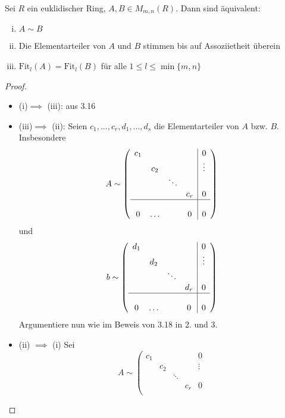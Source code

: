 \documentclass[a4paper, titlepage]{article}
\theoremstyle{definition}
\newcommand{\Fit}{\mathrm{Fit}}
\begin{document}
\begin{satz}
    Sei $R$ ein euklidischer Ring, $A,B\in M_{m,n}(R)$. Dann sind äquivalent:
    \begin{enumerate}[(i)]
        \item $A\sim B$
        \item Die Elementarteiler von $A$ und $B$ stimmen bis auf Assoziietheit überein
        \item $\Fit_{l}(A)=\Fit_{l}(B)$ für alle $ 1\leq l \leq \min\{m,n\}$
    \end{enumerate}
\end{satz}
\begin{proof}
    \begin{itemize}
        \item (i)$\implies$ (iii): aus 3.16
        \item (iii)$\implies$ (ii): Seien $c_1,...,c_r,d_1,...,d_s$ die Elementarteiler von $A$ bzw. $B$. Insbesondere
        $$A\sim \left(\begin{array}{cccc|c}
            c_1& & & &0\\
            & c_2& & & \vdots \\  
            & & \ddots& & \\
            & & & c_r&0 \\
            \hline & & & & \\
            0&\hdots &\ &0 & 0\\
        \end{array}\right)$$
        und
        $$b\sim \left(\begin{array}{cccc|c}
            d_1& & & &0\\
            & d_2& & & \vdots \\  
            & & \ddots& & \\
            & & & d_r&0 \\
            \hline & & & & \\
            0&\hdots &\ &0 & 0\\
        \end{array}\right)$$
        Argumentiere nun wie im Beweis von 3.18 in 2. und 3.
        \item (ii) $\implies$ (i) Sei
        $$A\sim \left(\begin{array}{cccc|c}
            c_1& & & &0\\
            & c_2& & & \vdots \\  
            & & \ddots& & \\
            & & & c_r&0 \\

\end{array}$$
\end{itemize}
\end{proof}
\end{document}
